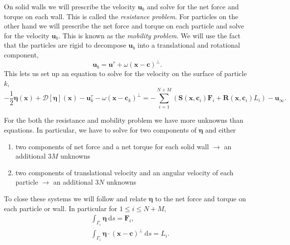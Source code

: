 \documentclass[preprint, 10pt]{elsarticle}
\begin{document}
On solid walls we will prescribe the velocity $\mathbf{u}_b$ and solve
for the net force and torque on each wall. This is called the {\em
resistance problem}. For particles on the other hand we will prescribe
the net force and torque on each particle and solve for the velocity
$\mathbf{u}_b$. This is known as the {\em mobility problem}. We will use
the fact that the particles are rigid to decompose $\mathbf{u}_b$ into a
translational and rotational component, \[ \mathbf{u}_b =
\mathbf{u}^\tau + \omega(\mathbf{x}-\mathbf{c})^\perp.\] This lets us
set up an equation to solve for the velocity on the surface of particle
$k$,
\begin{equation}\label{eq:vel_particles} -\frac{1}{2}\pmb{\eta}(\mathbf{x}) + \mathcal{D}[\pmb{\eta}](\mathbf{x}) - \mathbf{u}^\tau_k - \omega(\mathbf{x}-\mathbf{c}_k)^\perp =  -\sum\limits_{i=1}^{N+M} \left(\mathbf{S}(\mathbf{x},\mathbf{c}_i)\mathbf{F}_i + \mathbf{R}(\mathbf{x},\mathbf{c}_i)L_i\right) - \mathbf{u}_\infty.\end{equation}

For the both the resistance and mobility problem we have more unknowns than equations. In particular, we have to solve for two components of $\pmb{\eta}$ and either 
\begin{enumerate}[label=(\alph*)]
	\item two components of net force and a net torque for each solid wall $\rightarrow$ an additional $3M$ unknowns
	\item two components of translational velocity and an angular velocity of each particle $\rightarrow$ an additional $3N$ unknowns
\end{enumerate}

To close these systems we will follow \cite{Power1993} and relate
$\pmb{\eta}$ to the net force and torque on each particle or wall. In
particular for $1\leq i \leq N+M$,
\begin{subequations}\label{eq:closure}
\begin{align}
	&\int_{\Gamma_i} \pmb{\eta}~\text{d}s = \mathbf{F}_i,\\
	&\int_{\Gamma_i} \pmb{\eta}\cdot (\mathbf{x} - \mathbf{c})^\perp~\text{d}s = L_i.
\end{align} 
\end{subequations}
\end{document}
